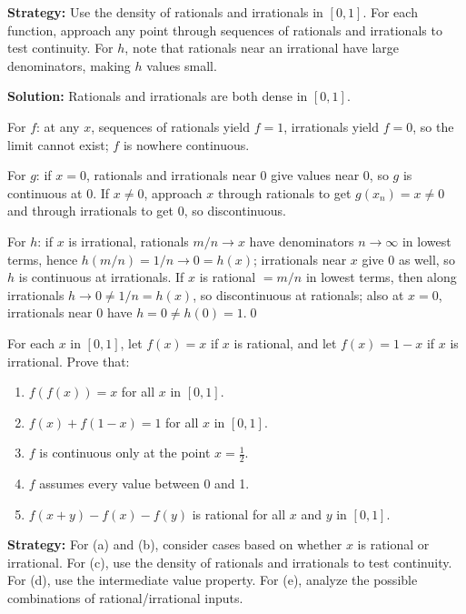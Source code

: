 \noindent\textbf{Strategy:} Use the density of rationals and irrationals in $[0,1]$. For each function, approach any point through sequences of rationals and irrationals to test continuity. For $h$, note that rationals near an irrational have large denominators, making $h$ values small.

\bigskip\noindent\textbf{Solution:}
Rationals and irrationals are both dense in $[0,1]$.

For $f$: at any $x$, sequences of rationals yield $f=1$, irrationals yield $f=0$, so the limit cannot exist; $f$ is nowhere continuous.

For $g$: if $x=0$, rationals and irrationals near $0$ give values near $0$, so $g$ is continuous at $0$. If $x\ne0$, approach $x$ through rationals to get $g(x_n)=x\ne 0$ and through irrationals to get $0$, so discontinuous.

For $h$: if $x$ is irrational, rationals $m/n\to x$ have denominators $n\to\infty$ in lowest terms, hence $h(m/n)=1/n\to 0=h(x)$; irrationals near $x$ give $0$ as well, so $h$ is continuous at irrationals. If $x$ is rational $=m/n$ in lowest terms, then along irrationals $h\to 0\ne 1/n=h(x)$, so discontinuous at rationals; also at $x=0$, irrationals near $0$ have $h=0\ne h(0)=1$.\qed



\begin{problembox}
For each \( x \) in \([0, 1]\), let \( f(x) = x \) if \( x \) is rational, and let \( f(x) = 1 - x \) if \( x \) is irrational. Prove that:
\begin{enumerate}[label=(\alph*)]
\item \( f(f(x)) = x \) for all \( x \) in \([0, 1]\).
\item \( f(x) + f(1 - x) = 1 \) for all \( x \) in \([0, 1]\).
\item \( f \) is continuous only at the point \( x = \frac{1}{2} \).
\item \( f \) assumes every value between 0 and 1.
\item \( f(x + y) - f(x) - f(y) \) is rational for all \( x \) and \( y \) in \([0, 1]\).
\end{enumerate}
\end{problembox}

\noindent\textbf{Strategy:} For (a) and (b), consider cases based on whether $x$ is rational or irrational. For (c), use the density of rationals and irrationals to test continuity. For (d), use the intermediate value property. For (e), analyze the possible combinations of rational/irrational inputs.


